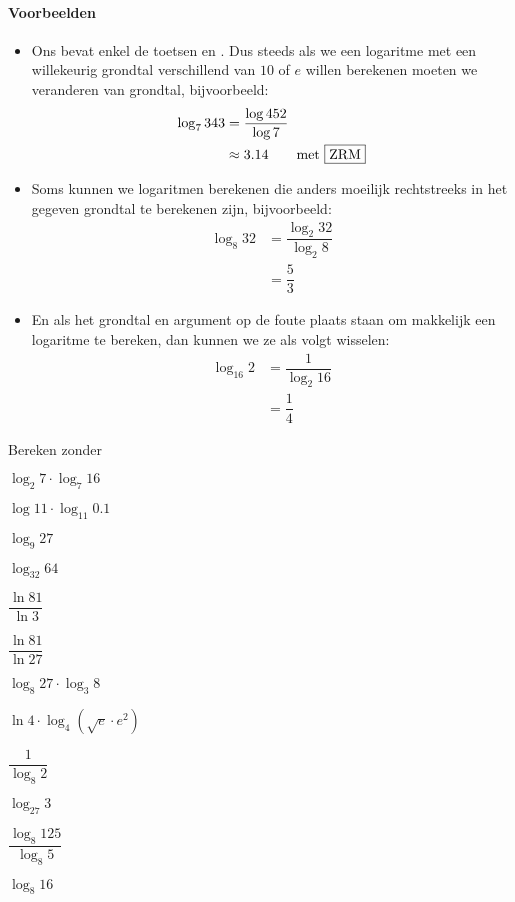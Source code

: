 \documentclass[12pt,twoside,a4paper]{article}
\begin{document}
\paragraph*{Voorbeelden}
\begin{itemize}
  \item Ons  bevat enkel de toetsen  en . Dus steeds als we een logaritme met een willekeurig grondtal verschillend van $10$ of $e$ willen berekenen moeten we veranderen van grondtal, bijvoorbeeld:
  \begin{align*}
    \log_{7}343 &= \dfrac{\log 452}{\log 7}\\
                &\approx 3.14 \qquad\mbox{met \zrm{ZRM}}
  \end{align*}
  \item Soms kunnen we logaritmen berekenen die anders moeilijk rechtstreeks in het gegeven grondtal te berekenen zijn, bijvoorbeeld:
  \begin{align*}
    \log_{8}32 &= \dfrac{\log_2 32}{\log_2 8}\\
               &= \dfrac{5}{3}
  \end{align*}
  \item En als het grondtal en argument op de foute plaats staan om makkelijk een logaritme te bereken, dan kunnen we ze als volgt wisselen:
  \begin{align*}
    \log_{16}2 &= \dfrac{1}{\log_2 16}\\
               &= \dfrac{1}{4}
  \end{align*}
\end{itemize}

\begin{oefening} %
Bereken zonder 
\begin{exlist}{2}
  \item $\log_2 7 \cdot \log_7 16$
  \item $\log 11 \cdot \log_{11} 0.1$
  \item $\log_9 27$
  \item $\log_{32} 64$
  \item $\dfrac{\ln 81}{\ln 3}$
  \item $\dfrac{\ln 81}{\ln 27}$
  \item $\log_8 27 \cdot \log_3 8$
  \item $\ln 4 \cdot \log_4 (\sqrt{e}\cdot e^2)$
  \item $\dfrac{1}{\log_8 2}$
  \item $\log_27 3$
  \item $\dfrac{\log_8 125}{\log_8 5}$
  \item $\log_8 16$
\end{exlist}
\end{oefening}
\end{document}
